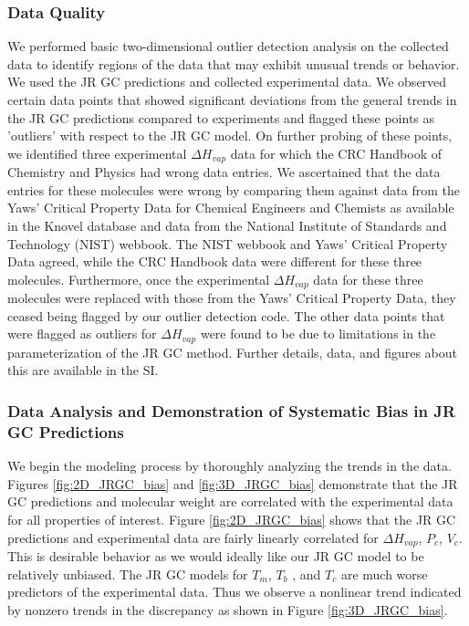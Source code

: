 \documentclass[journal=jacsat,manuscript=article, ]{achemso}
\begin{document}
\subsubsection{Data Quality}
We performed basic two-dimensional outlier detection analysis on the collected data to identify regions of the data that may exhibit unusual trends or behavior. 
We used the JR GC predictions and collected experimental data. We observed certain data points that showed significant deviations from the general trends in the JR GC predictions compared to experiments and flagged these points as 'outliers' with respect to the JR GC model. 
On further probing of these points, we identified three experimental $\Delta H_{vap}$ data for which the CRC Handbook of Chemistry and Physics had wrong data entries. 
We ascertained that the data entries for these molecules were wrong by comparing them against data from the Yaws' Critical Property Data for Chemical Engineers and Chemists \cite{yaws-critical-property} as available in the Knovel database and data from the National Institute of Standards and Technology (NIST) \cite{informaticsNISTChemistryWebBook} webbook. 
The NIST webbook and Yaws' Critical Property Data agreed, while the CRC Handbook data were different for these three molecules. 
Furthermore, once the experimental $\Delta H_{vap}$ data for these three molecules were replaced with those from the Yaws' Critical Property Data, they ceased being flagged by our outlier detection code. 
The other data points that were flagged as outliers for $\Delta H_{vap}$ were found to be due to limitations in the parameterization of the JR GC method. Further details, data, and figures about this are available in the SI. 


\subsubsection{Data Analysis and Demonstration of Systematic Bias in JR GC Predictions}
We begin the modeling process by thoroughly analyzing the trends in the data. Figures \ref{fig:2D_JRGC_bias} and \ref{fig:3D_JRGC_bias} demonstrate that the JR GC predictions and molecular weight are correlated with the experimental data for all properties of interest. 
Figure \ref{fig:2D_JRGC_bias} shows that the JR GC predictions and experimental data are fairly linearly correlated for $\Delta H_{vap}$, $P_c$, $V_c$. This is desirable behavior as we would ideally like our JR GC model to be relatively unbiased. 
The JR GC models for $T_m$, $T_b$ , and $T_c$ are much worse predictors of the experimental data. Thus we observe a nonlinear trend indicated by nonzero trends in the discrepancy as shown in Figure \ref{fig:3D_JRGC_bias}. 
\end{document}
